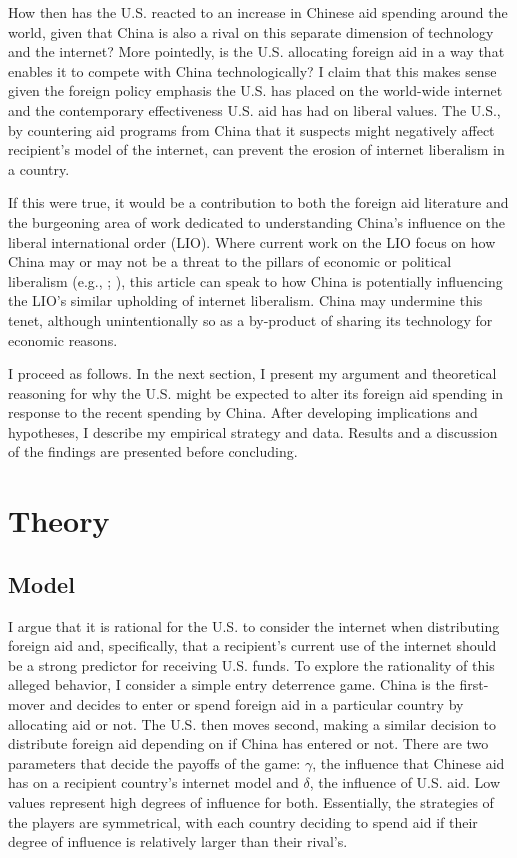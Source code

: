 \documentclass[12pt]{article}
\begin{document}
How then has the U.S. reacted to an increase in Chinese aid spending around the world, given that China is also a rival on this separate dimension of technology and the internet? More pointedly, is the U.S. allocating foreign aid in a way that enables it to compete with China technologically? I claim that this makes sense given the foreign policy emphasis the U.S. has placed on the world-wide internet and the contemporary effectiveness U.S. aid has had on liberal values. The U.S., by countering aid programs from China that it suspects might negatively affect recipient's model of the internet, can prevent the erosion of internet liberalism in a country.

If this were true, it would be a contribution to both the foreign aid literature and the burgeoning area of work dedicated to understanding China's influence on the liberal international order (LIO). Where current work on the LIO focus on how China may or may not be a threat to the pillars of economic or political liberalism (e.g., \cite{weiss}; \cite{broz}), this article can speak to how China is potentially influencing the LIO's similar upholding of internet liberalism. China may undermine this tenet, although unintentionally so as a by-product of sharing its technology for economic reasons.

I proceed as follows. In the next section, I present my argument and theoretical reasoning for why the U.S. might be expected to alter its foreign aid spending in response to the recent spending by China. After developing implications and hypotheses, I describe my empirical strategy and data. Results and a discussion of the findings are presented before concluding.

\section*{Theory}
\subsection*{Model}
I argue that it is rational for the U.S. to consider the internet when distributing foreign aid and, specifically, that a recipient's current use of the internet should be a strong predictor for receiving U.S. funds. To explore the rationality of this alleged behavior, I consider a simple entry deterrence game. China is the first-mover and decides to enter or spend foreign aid in a particular country by allocating aid or not. The U.S. then moves second, making a similar decision to distribute foreign aid depending on if China has entered or not. There are two parameters that decide the payoffs of the game: $\gamma$, the influence that Chinese aid has on a recipient country's internet model and $\delta$, the influence of U.S. aid. Low values represent high degrees of influence for both. Essentially, the strategies of the players are symmetrical, with each country deciding to spend aid if their degree of influence is relatively larger than their rival's.
\end{document}
